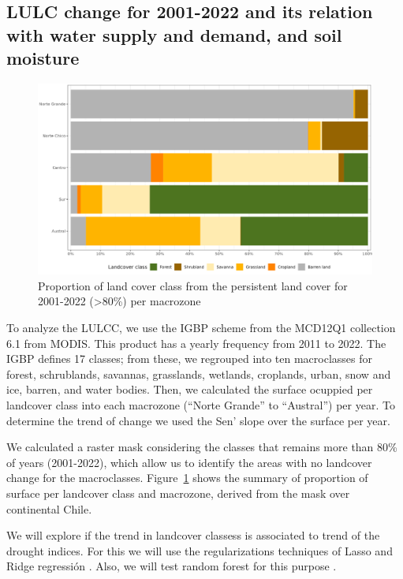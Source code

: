 \documentclass[
  number,
  preprint,
  3p,
  onecolumn]{elsarticle}
\begin{document}
\hypertarget{sec-methods_lulc}{%
\subsection{LULC change for 2001-2022 and its relation with water supply
and demand, and soil moisture}\label{sec-methods_lulc}}

\begin{figure}[!ht]

{\centering \includegraphics{../output/figs/LC_pers80_per_macrozone.png}

}

\caption{\label{fig-LCprop}Proportion of land cover class from the
persistent land cover for 2001-2022 (\textgreater80\%) per macrozone}

\end{figure}

To analyze the LULCC, we use the IGBP scheme from the MCD12Q1 collection
6.1 from MODIS. This product has a yearly frequency from 2011 to 2022.
The IGBP defines 17 classes; from these, we regrouped into ten
macroclasses for forest, schrublands, savannas, grasslands, wetlands,
croplands, urban, snow and ice, barren, and water bodies. Then, we
calculated the surface ocuppied per landcover class into each macrozone
(``Norte Grande'' to ``Austral'') per year. To determine the trend of
change we used the Sen' slope \citep{Sen1968} over the surface per year.

We calculated a raster mask considering the classes that remains more
than 80\% of years (2001-2022), which allow us to identify the areas
with no landcover change for the macroclasses. Figure~\ref{fig-LCprop}
shows the summary of proportion of surface per landcover class and
macrozone, derived from the mask over continental Chile.

We will explore if the trend in landcover classess is associated to
trend of the drought indices. For this we will use the regularizations
techniques of Lasso \citep{Tibshirani2010} and Ridge regressión
\citep{Hoerl1970}. Also, we will test random forest for this purpose
\citep{Ho1995}.
\end{document}
